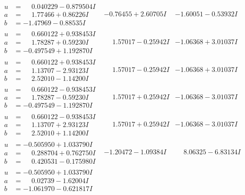 \documentclass[1p]{elsarticle_modified}
\theoremstyle{definition}
\begin{document}
$$\begin{array}{c|c|c}
\begin{aligned}
u &= \phantom{-}0.040229 - 0.879504 I \\
a &= \phantom{-}1.77466 + 0.86226 I \\
b &= -1.47969 - 0.88535 I\end{aligned}
 & -0.76455 + 2.60705 I & -1.60051 - 0.53932 I \\ \hline\begin{aligned}
u &= \phantom{-}0.660122 + 0.938453 I \\
a &= \phantom{-}1.78287 + 0.59230 I \\
b &= -0.497549 + 1.192870 I\end{aligned}
 & \phantom{-}1.57017 - 0.25942 I & -1.06368 + 3.01037 I \\ \hline\begin{aligned}
u &= \phantom{-}0.660122 + 0.938453 I \\
a &= \phantom{-}1.13707 - 2.93123 I \\
b &= \phantom{-}2.52010 - 1.14200 I\end{aligned}
 & \phantom{-}1.57017 - 0.25942 I & -1.06368 + 3.01037 I \\ \hline\begin{aligned}
u &= \phantom{-}0.660122 - 0.938453 I \\
a &= \phantom{-}1.78287 - 0.59230 I \\
b &= -0.497549 - 1.192870 I\end{aligned}
 & \phantom{-}1.57017 + 0.25942 I & -1.06368 - 3.01037 I \\ \hline\begin{aligned}
u &= \phantom{-}0.660122 - 0.938453 I \\
a &= \phantom{-}1.13707 + 2.93123 I \\
b &= \phantom{-}2.52010 + 1.14200 I\end{aligned}
 & \phantom{-}1.57017 + 0.25942 I & -1.06368 - 3.01037 I \\ \hline\begin{aligned}
u &= -0.505950 + 1.033790 I \\
a &= \phantom{-}0.288704 + 0.762750 I \\
b &= \phantom{-}0.420531 - 0.175980 I\end{aligned}
 & -1.20472 - 1.09384 I & \phantom{-}8.06325 - 6.83134 I \\ \hline\begin{aligned}
u &= -0.505950 + 1.033790 I \\
a &= \phantom{-}0.02739 - 1.62004 I \\
b &= -1.061970 - 0.621817 I\end{aligned}

\end{array}$$
\end{document}
